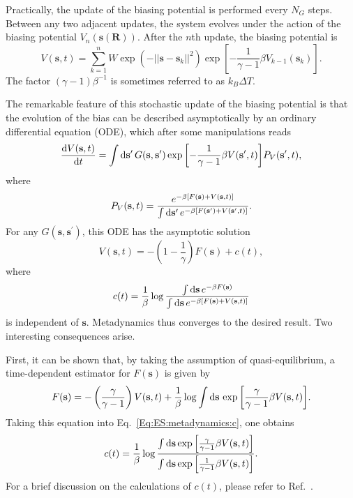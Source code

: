 Practically, the update of the biasing potential is performed every $N_G$ steps. Between any two adjacent updates, the system evolves under the action of the biasing potential $V_n(\mathbf{s}(\mathbf{R}))$. After the $n$th update, the biasing potential is
\begin{equation}
    V(\mathbf{s},t)=\sum_{k=1}^n W\exp{\left(-||\mathbf{s}-\mathbf{s}_k||^2\right)}\exp{\left[-\frac{1}{\gamma-1}\beta V_{k-1}(\mathbf{s}_k)\right]}.
\end{equation}
The factor $(\gamma-1)\beta^{-1}$ is sometimes referred to as $k_B\Delta T$.

The remarkable feature of this stochastic update of the biasing potential is that the evolution of the bias can be described asymptotically by an ordinary differential equation (ODE), which after some manipulations reads
\begin{equation}
    \frac{\mathop{}\!\mathrm{d} V(\mathbf{s},t)}{\mathop{}\!\mathrm{d} t}=\int \mathop{}\!\mathrm{d} \mathbf{s}^\prime\, G(\mathbf{s},\mathbf{s}^\prime)\exp{\left[-\frac{1}{\gamma-1}\beta V(\mathbf{s}^\prime,t)\right]}P_V(\mathbf{s}^\prime,t),
\end{equation}
where
\begin{equation}
    P_V(\mathbf{s},t)=\frac{e^{-\beta[F(\mathbf{s})+V(\mathbf{s},t)]}}{\int \mathop{}\!\mathrm{d} \mathbf{s}^\prime\, e^{-\beta[F(\mathbf{s}^\prime)+V(\mathbf{s}^\prime,t)]}}.
\end{equation}
For any $G(\mathbf{s},\mathbf{s}^\prime)$, this ODE has the asymptotic solution
\begin{equation}
    V(\mathbf{s},t)=-\left(1-\frac{1}{\gamma}\right)F(\mathbf{s})+c(t),
\end{equation}
where
\begin{equation}
    c(t)=\frac{1}{\beta}\log{\frac{\int \mathop{}\!\mathrm{d}\mathbf{s}\, e^{-\beta F(\mathbf{s})}}{\int \mathop{}\!\mathrm{d}\mathbf{s}\, e^{-\beta \left[F(\mathbf{s})+V(\mathbf{s},t)\right]}}}
    \label{Eq:ES:metadynamics:c}
\end{equation}
is independent of $\mathbf{s}$. Metadynamics thus converges to the desired result. Two interesting consequences arise.

First, it can be shown that, by taking the assumption of quasi-equilibrium, a time-dependent estimator for $F(\mathbf{s})$ is given by\cite{TiwaryJPCB2015}
\begin{equation}
    F(\mathbf{s})=-\left(\frac{\gamma}{\gamma -1}\right)V(\mathbf{s},t)+\frac{1}{\beta}\log{\int \mathop{}\!\mathrm{d}\mathbf{s}\, \exp{\left[\frac{\gamma}{\gamma-1}\beta V(\mathbf{s},t)\right]}}.
\end{equation}
Taking this equation into Eq.~\ref{Eq:ES:metadynamics:c}, one obtains
\begin{equation}
    c(t)=\frac{1}{\beta}\log{\frac{\int \mathop{}\!\mathrm{d}\mathbf{s}\exp{\left[\frac{\gamma}{\gamma-1}\beta V(\mathbf{s},t)\right]}}{\int \mathop{}\!\mathrm{d}\mathbf{s}\exp{\left[\frac{1}{\gamma-1}\beta V(\mathbf{s},t)\right]}}}.
\end{equation}
For a brief discussion on the calculations of $c(t)$, please refer to Ref.~\cite{GibertiJCTC2020}.

